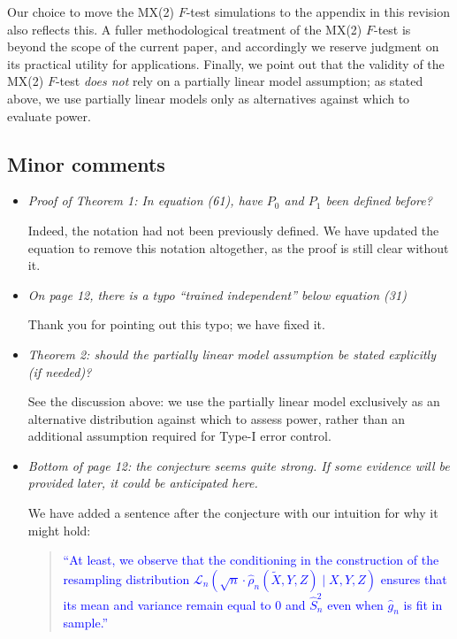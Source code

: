\documentclass[12pt]{article}
\newcommand{\srx}{X}
\newcommand{\srz}{Z}
\newcommand{\srxk}{\widetilde X}
\newcommand{\sry}{Y}
\begin{document}
\noindent Our choice to move the MX(2) $F$-test simulations to the appendix in this revision also reflects this. A fuller methodological treatment of the MX(2) $F$-test is beyond the scope of the current paper, and accordingly we reserve judgment on its practical utility for applications. Finally, we point out that the validity of the MX(2) $F$-test \textit{does not} rely on a partially linear model assumption; as stated above, we use partially linear models only as alternatives against which to evaluate power.

\subsection{Minor comments}

\begin{itemize}
	\item \textsl{Proof of Theorem 1: In equation (61), have $P_0$ and $P_1$ been defined before?}
	
	Indeed, the notation had not been previously defined. We have updated the equation to remove this notation altogether, as the proof is still clear without it.

	\item \textsl{On page 12, there is a typo “trained independent” below equation (31)}
	
	Thank you for pointing out this typo; we have fixed it.

	\item \textsl{Theorem 2: should the partially linear model assumption be stated explicitly (if needed)?}
	
	See the discussion above: we use the partially linear model exclusively as an alternative distribution against which to assess power, rather than an additional assumption required for Type-I error control.

	\item \textsl{Bottom of page 12: the conjecture seems quite strong. If some evidence will be provided later, it could be anticipated here.}
	
	We have added a sentence after the conjecture with our intuition for why it might hold:

	\begin{quote}
		\textcolor{blue}{``At least, we observe that the conditioning in the construction of the resampling distribution $\mathcal L_n(\sqrt n \cdot \widehat \rho_n(\srxk, \sry, \srz) \mid \srx, \sry, \srz)$ ensures that its mean and variance remain equal to $0$ and $\widehat S_n^2$ even when $\widehat g_n$ is fit in sample.''}
	\end{quote}


\end{itemize}
\end{document}

